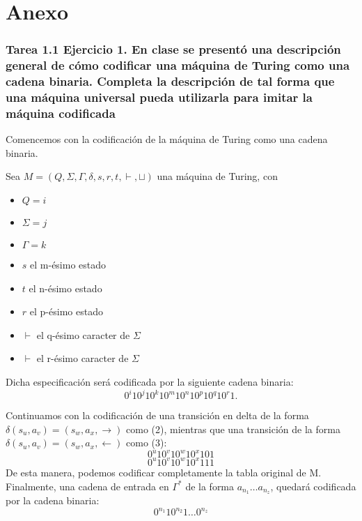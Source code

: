 \documentclass[12pt]{article}
\begin{document}
\newpage
\section*{Anexo}

\subsubsection*{Tarea 1.1 Ejercicio 1. En clase se presentó una descripción general de cómo codificar una máquina de Turing como una cadena binaria. Completa la descripción de tal forma que una máquina universal pueda utilizarla para imitar la máquina codificada}

Comencemos con la codificación de la máquina de Turing como una cadena binaria.

Sea $M = (Q,\Sigma,\Gamma,\delta,s,r,t,\vdash,\sqcup)$ una máquina de Turing, con
\begin{itemize}
\item $Q = i$
\item $\Sigma = j$
\item $\Gamma = k$
\item $s$ el m-ésimo estado
\item $t$ el n-ésimo estado
\item $r$ el p-ésimo estado
\item $\vdash$ el q-ésimo caracter de $\Sigma$
\item $\vdash$ el r-ésimo caracter de $\Sigma$ 
\end{itemize}
Dicha especificación será codificada por la siguiente cadena binaria:\\
\begin{equation}
  0^i10^j10^k10^m10^n10^p10^q10^r1.
\end{equation}

Continuamos con la codificación de una transición en delta de la forma $\delta(s_u,a_v) = (s_w,a_x,\rightarrow)$ como (2),
mientras que una transición de la forma $\delta(s_u,a_v) = (s_w,a_x,\leftarrow)$ como (3):\\
\begin{equation}
  0^u10^v10^w10^x101
\end{equation}
\begin{equation}
  0^u10^v10^w10^x111  
\end{equation}
De esta manera, podemos codificar completamente la tabla original de M.\\
Finalmente, una cadena de entrada en $\Gamma^*$ de la forma $a_{n_1} \dots a_{n_z}$, quedará codificada por la cadena binaria:\\
\begin{equation}
0^{n_1}10^{n_2}1\dots0^{n_z}
\end{equation}
\end{document}
